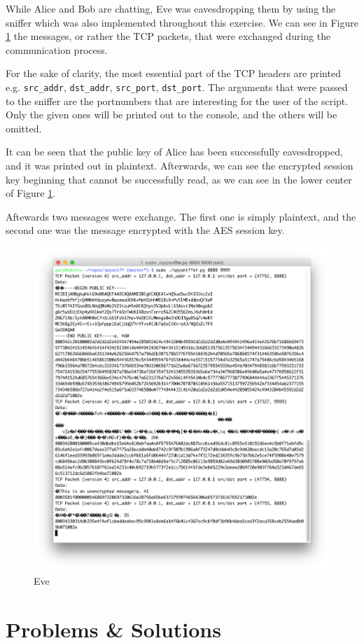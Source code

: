 \documentclass[11pt, a4paper]{article}
\begin{document}
While Alice and Bob are chatting, Eve was eavesdropping them by using
the sniffer which was also implemented throughout this exercise. We
can see in Figure \ref{fig:test_eve} the messages, or rather the TCP
packets, that were exchanged during the communication process. 

For the sake of clarity, the most essential part of the TCP headers
are printed e.g. \lstinline|src_addr|, \lstinline|dst_addr|,
\lstinline|src_port|, \lstinline|dst_port|. The arguments that were
passed to the sniffer are the portnumbers that are interesting for the
user of the script. Only the given ones will be printed out to the
console, and the others will be omitted. 

It can be seen that the public key of Alice has been successfully
eavesdropped, and it was printed out in plaintext. Afterwards, we can
see the encrypted session key beginning that cannot be successfully
read, as we can see in the lower center of Figure \ref{fig:test_eve}. 

Aftewards two messages were exchange. The first one is simply
plaintext, and the second one was the message encrypted with the AES
session key. 

\begin{figure}[H]
  \centering
  \includegraphics[width=0.7\linewidth]{img/test_eve}
  \caption{Eve}
  \label{fig:test_eve}
\end{figure}


\section{Problems \& Solutions}
\end{document}
